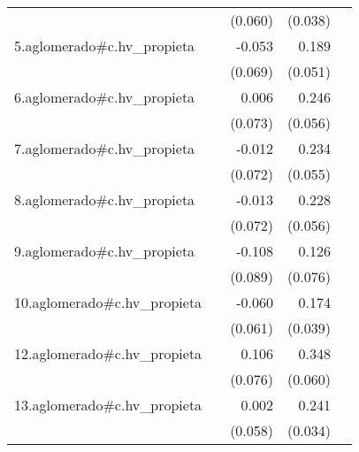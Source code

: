 {\begin{longtable}{l*{4}{D{.}{.}{-1}}}
            &                     &     (0.060)         &     (0.038)         &                     \\
\addlinespace
5.aglomerado#c.hv\_propieta&                     &      -0.053         &       0.189\sym{***}&                     \\
            &                     &     (0.069)         &     (0.051)         &                     \\
\addlinespace
6.aglomerado#c.hv\_propieta&                     &       0.006         &       0.246\sym{***}&                     \\
            &                     &     (0.073)         &     (0.056)         &                     \\
\addlinespace
7.aglomerado#c.hv\_propieta&                     &      -0.012         &       0.234\sym{***}&                     \\
            &                     &     (0.072)         &     (0.055)         &                     \\
\addlinespace
8.aglomerado#c.hv\_propieta&                     &      -0.013         &       0.228\sym{***}&                     \\
            &                     &     (0.072)         &     (0.056)         &                     \\
\addlinespace
9.aglomerado#c.hv\_propieta&                     &      -0.108         &       0.126         &                     \\
            &                     &     (0.089)         &     (0.076)         &                     \\
\addlinespace
10.aglomerado#c.hv\_propieta&                     &      -0.060         &       0.174\sym{***}&                     \\
            &                     &     (0.061)         &     (0.039)         &                     \\
\addlinespace
12.aglomerado#c.hv\_propieta&                     &       0.106         &       0.348\sym{***}&                     \\
            &                     &     (0.076)         &     (0.060)         &                     \\
\addlinespace
13.aglomerado#c.hv\_propieta&                     &       0.002         &       0.241\sym{***}&                     \\
            &                     &     (0.058)         &     (0.034)         &                     \\

\end{longtable}}
